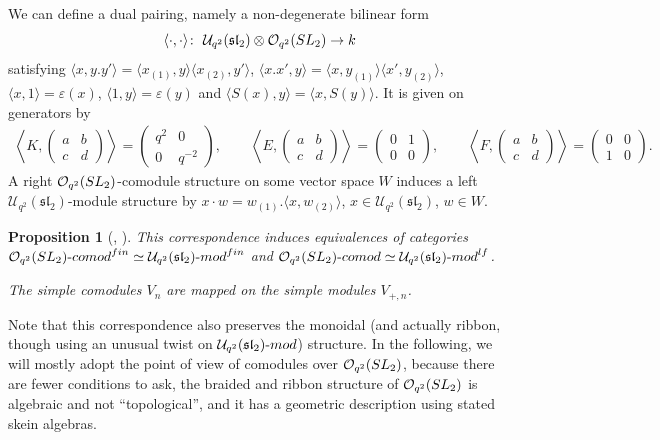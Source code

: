 \documentclass[11pt]{article}
\numberwithin{equation}{section}
\numberwithin{equation}{section}
\newtheorem{Proposition}[Theorem]{Proposition}
 { \theoremstyle{definition}
\newtheorem{Definition}[Theorem]{Definition}
\newtheorem{Note}[Theorem]{Note}
\newtheorem{Example}[Theorem]{Example}
\newtheorem{Remark}[Theorem]{Remark} }
\newcommand{\Oq}{\mathcal{O}_{q^2}({\rm SL}_2)}
\newcommand{\Uq}{\mathcal{U}_{q^2}(\mathfrak{sl}_2)}
\newcommand{\Uqmod}{\Uq\text{-}{\rm mod}}
\begin{document}
\begin{Definition}
We can define a dual pairing, namely a non-degenerate bilinear form
\[
\langle \cdot,\cdot\rangle \colon \  \Uq \otimes \Oq \to k
\] satisfying $\langle x, y.y'\rangle = \langle x_{(1)},y\rangle \langle x_{(2)},y'\rangle$, $\langle x.x', y\rangle = \langle x,y_{(1)}\rangle \langle x',y_{(2)}\rangle$, $\langle x,1\rangle = \varepsilon(x)$, $\langle 1,y\rangle = \varepsilon(y)$ and $\langle S(x),y\rangle = \langle x,S(y)\rangle$. It is given on generators by
\begin{gather*}
 \left\langle K,\begin{pmatrix}a&b\\c&d \end{pmatrix} \right\rangle =
 \begin{pmatrix}q^2&0\\0&q^{-2} \end{pmatrix}\!, \qquad \!
 \left\langle E,
 \begin{pmatrix}a&b\\c&d \end{pmatrix} \right\rangle =
 \begin{pmatrix}0&1\\0&0 \end{pmatrix}\!,\qquad \!
 \left\langle F,\begin{pmatrix} a&b\\c&d \end{pmatrix}\right\rangle =
 \begin{pmatrix}0&0\\1&0 \end{pmatrix}\!.
 \end{gather*}
 A right $\Oq$-comodule structure on some vector space $W$ induces a left $\Uq$-module structure by $x\cdot w = w_{(1)}. \langle x,w_{(2)} \rangle$, $x \in \Uq$, $w\in W$.
\end{Definition}

\begin{Proposition}[{\cite[equation~(3.3), p.~126]{Abe}, \cite[Theorem~7.9]{Takeuchi}}]\label{propOqcomodUqmod}
This correspondence induces equivalences of categories $\Oq\text{-}{\rm comod}^{\rm fin}\simeq \Uq\text{-}{\rm mod}^{\rm fin}$ and $\Oq\text{-}{\rm comod} \simeq \Uq\text{-}{\rm mod}^{\rm lf}$.

The simple comodules $V_n$ are mapped on the simple modules $V_{+,n}$.
\end{Proposition}

Note that this correspondence also preserves the monoidal (and actually ribbon, though using an unusual twist on $\Uqmod$) structure. In the following, we will mostly adopt the point of view of comodules over $\Oq$, because there are fewer conditions to ask, the braided and ribbon structure of $\Oq$ is algebraic and not ``topological'', and it has a geometric description using stated skein algebras.
\end{document}
